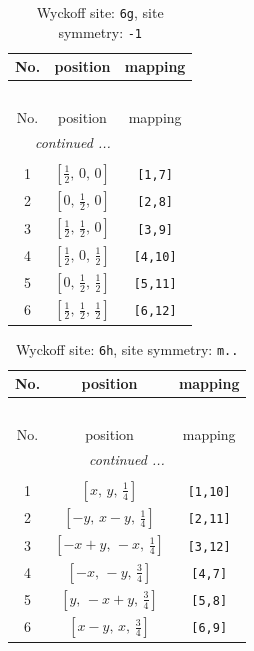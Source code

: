 \documentclass[fleqn,8pt]{jsarticle}
\begin{document}
\renewcommand{\arraystretch}{1.2}
\begin{longtable}{ccc}
\caption{Wyckoff site: {\tt 6g}, site symmetry: {\tt -1}}
 \\
 \hline \hline
No. & position & mapping \\ \hline \endfirsthead

\multicolumn{2}{l}{\tablename\ \thetable{}} \\
 \hline \hline
No. & position & mapping \\ \hline \endhead

 \hline \hline
\multicolumn{2}{r}{\footnotesize\it continued ...} \\ \endfoot

 \hline \hline
\multicolumn{2}{r}{} \\ \endlastfoot

1 & $\left[ \frac{1}{2},\, 0,\, 0 \right]$ & {\tt [1,7]} \\ \hline
2 & $\left[ 0,\, \frac{1}{2},\, 0 \right]$ & {\tt [2,8]} \\ \hline
3 & $\left[ \frac{1}{2},\, \frac{1}{2},\, 0 \right]$ & {\tt [3,9]} \\ \hline
4 & $\left[ \frac{1}{2},\, 0,\, \frac{1}{2} \right]$ & {\tt [4,10]} \\ \hline
5 & $\left[ 0,\, \frac{1}{2},\, \frac{1}{2} \right]$ & {\tt [5,11]} \\ \hline
6 & $\left[ \frac{1}{2},\, \frac{1}{2},\, \frac{1}{2} \right]$ & {\tt [6,12]} \\
\end{longtable}
\renewcommand{\arraystretch}{1.2}
\begin{longtable}{ccc}
\caption{Wyckoff site: {\tt 6h}, site symmetry: {\tt m..}}
 \\
 \hline \hline
No. & position & mapping \\ \hline \endfirsthead

\multicolumn{2}{l}{\tablename\ \thetable{}} \\
 \hline \hline
No. & position & mapping \\ \hline \endhead

 \hline \hline
\multicolumn{2}{r}{\footnotesize\it continued ...} \\ \endfoot

 \hline \hline
\multicolumn{2}{r}{} \\ \endlastfoot

1 & $\left[ x,\, y,\, \frac{1}{4} \right]$ & {\tt [1,10]} \\ \hline
2 & $\left[ - y,\, x - y,\, \frac{1}{4} \right]$ & {\tt [2,11]} \\ \hline
3 & $\left[ - x + y,\, - x,\, \frac{1}{4} \right]$ & {\tt [3,12]} \\ \hline
4 & $\left[ - x,\, - y,\, \frac{3}{4} \right]$ & {\tt [4,7]} \\ \hline
5 & $\left[ y,\, - x + y,\, \frac{3}{4} \right]$ & {\tt [5,8]} \\ \hline
6 & $\left[ x - y,\, x,\, \frac{3}{4} \right]$ & {\tt [6,9]} \\
\end{longtable}
\end{document}
